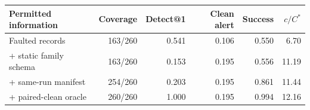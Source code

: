 \begin{tabular}{lrrrrr}\toprule
Permitted information & Coverage & Detect@1 & Clean alert & Success & $c/C^\ast$\\\midrule
Faulted records & 163/260 & 0.541 & 0.106 & 0.550 & 6.70\\
+ static family schema & 163/260 & 0.153 & 0.195 & 0.556 & 11.19\\
+ same-run manifest & 254/260 & 0.203 & 0.195 & 0.861 & 11.44\\
+ paired-clean oracle & 260/260 & 1.000 & 0.195 & 0.994 & 12.16\\\bottomrule
\end{tabular}

